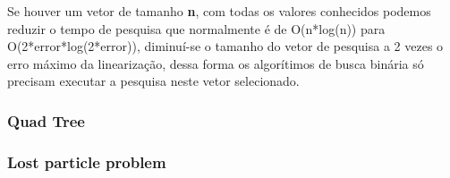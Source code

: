 Se houver um vetor de tamanho \textbf{n}, com todas os valores conhecidos podemos reduzir o tempo de pesquisa que normalmente é de O(n*log(n)) para O(2*error*log(2*error)), 
diminuí-se o tamanho do vetor de pesquisa a 2 vezes o erro máximo da linearização, dessa forma os algorítimos de busca binária só precisam executar a pesquisa neste vetor selecionado.

\subsubsection{Quad Tree}

\subsubsection{Lost particle problem}
